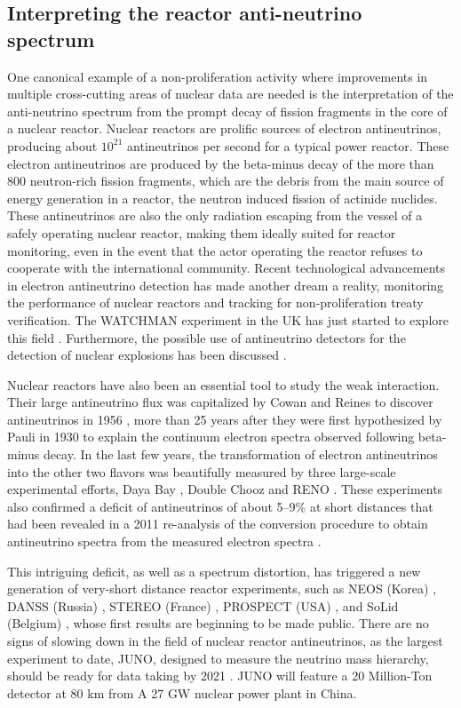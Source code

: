 \documentclass[letterpaper,draft]{ar-1col}
\begin{document}
\subsection{Interpreting the reactor anti-neutrino spectrum}

One canonical example of a non-proliferation activity where improvements in multiple cross-cutting areas of nuclear data are needed is the interpretation of the anti-neutrino spectrum from the prompt decay of fission fragments in the core of a nuclear reactor. Nuclear reactors are prolific sources of electron antineutrinos, producing about $10^{21}$ antineutrinos per second for a typical power reactor.  These electron antineutrinos are produced by the beta-minus decay of the more than 800 neutron-rich fission fragments, which are the debris from the main source of energy generation in a reactor, the neutron induced fission of actinide nuclides.  These antineutrinos are also the only radiation escaping from the vessel of a safely operating nuclear reactor, making them ideally suited for reactor monitoring, even in the event that the actor operating the reactor refuses to cooperate with the international community.  Recent technological advancements in electron antineutrino detection has made another dream a reality, monitoring the performance of nuclear reactors and tracking  for non-proliferation treaty verification.   The WATCHMAN experiment in the UK has just started to explore this field \cite{Cha18}.  Furthermore, the possible use of antineutrino detectors for the detection of nuclear explosions has been discussed \cite{CarAx}.
 
Nuclear reactors have also been an essential tool to study the weak interaction.  Their large antineutrino flux was capitalized by Cowan and Reines to discover antineutrinos in 1956 \cite{Cow56}, more than 25 years after they were first hypothesized by Pauli in 1930 to explain the continuum electron spectra observed following beta-minus decay.   In the last few years, the transformation of electron antineutrinos into the other two flavors was beautifully measured by three large-scale experimental efforts, Daya Bay \cite{An16}, Double Chooz \cite{Abe12} and RENO \cite{Cho16}.   These experiments also confirmed a deficit of antineutrinos of about 5--9\% at short distances that had been revealed in a 2011 re-analysis of the conversion procedure to obtain antineutrino spectra from the measured electron spectra \cite{Men11}.

This intriguing deficit, as well as a spectrum distortion, has triggered a new generation of very-short distance reactor experiments, such as NEOS (Korea) \cite{Ko17}, DANSS (Russia) \cite{AleAx}, STEREO (France) \cite{AllAx}, PROSPECT (USA) \cite{Ash16}, and SoLid (Belgium) \cite{Kal17}, whose first results are beginning to be made public.  There are no signs of slowing down in the field of nuclear reactor antineutrinos, as the largest experiment to date, JUNO, designed to measure the neutrino mass hierarchy, should be ready for data taking by 2021 \cite{SalAx}.  JUNO will feature a 20 Million-Ton detector at 80 km from A 27 GW nuclear power plant in China.
\end{document}
